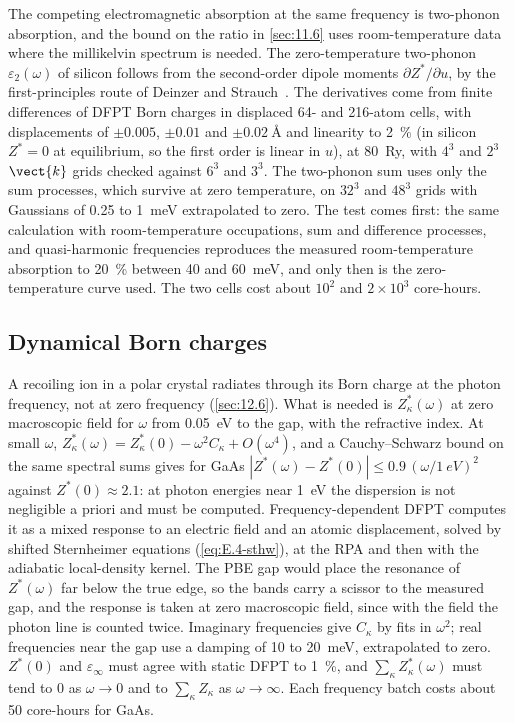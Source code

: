 The competing electromagnetic absorption at the same frequency is two-phonon absorption, and the bound on the ratio in \cref{sec:11.6} uses room-temperature data where the millikelvin spectrum is needed. The zero-temperature two-phonon $\varepsilon_2(\omega)$ of silicon follows from the second-order dipole moments $\partial Z^*/\partial u$, by the first-principles route of Deinzer and Strauch~\cite{deinzer2004two}. The derivatives come from finite differences of DFPT Born charges in displaced 64- and 216-atom cells, with displacements of $\pm0.005$, $\pm0.01$ and $\pm\SI{0.02}{\angstrom}$ and linearity to \SI{2}{\percent} (in silicon $Z^* = 0$ at equilibrium, so the first order is linear in $u$), at \SI{80}{Ry}, with $4^3$ and $2^3$ $\vect{k}$ grids checked against $6^3$ and $3^3$. The two-phonon sum uses only the sum processes, which survive at zero temperature, on $32^3$ and $48^3$ grids with Gaussians of 0.25 to \SI{1}{meV} extrapolated to zero. The test comes first: the same calculation with room-temperature occupations, sum and difference processes, and quasi-harmonic frequencies reproduces the measured room-temperature absorption to \SI{20}{\percent} between 40 and \SI{60}{meV}, and only then is the zero-temperature curve used. The two cells cost about $10^2$ and $2\times10^3$ core-hours.

\subsection{Dynamical Born charges}

A recoiling ion in a polar crystal radiates through its Born charge at the photon frequency, not at zero frequency (\cref{sec:12.6}). What is needed is $Z^*_\kappa(\omega)$ at zero macroscopic field for $\omega$ from \SI{0.05}{eV} to the gap, with the refractive index. At small $\omega$, $Z^*_\kappa(\omega) = Z^*_\kappa(0) - \omega^2C_\kappa + O(\omega^4)$, and a Cauchy--Schwarz bound on the same spectral sums gives for GaAs $|Z^*(\omega) - Z^*(0)| \le 0.9\,(\omega/\SI{1}{eV})^2$ against $Z^*(0) \approx 2.1$: at photon energies near \SI{1}{eV} the dispersion is not negligible a priori and must be computed. Frequency-dependent DFPT computes it as a mixed response to an electric field and an atomic displacement, solved by shifted Sternheimer equations (\cref{eq:E.4-sthw}), at the RPA and then with the adiabatic local-density kernel. The PBE gap would place the resonance of $Z^*(\omega)$ far below the true edge, so the bands carry a scissor to the measured gap, and the response is taken at zero macroscopic field, since with the field the photon line is counted twice. Imaginary frequencies give $C_\kappa$ by fits in $\omega^2$; real frequencies near the gap use a damping of 10 to \SI{20}{meV}, extrapolated to zero. $Z^*(0)$ and $\varepsilon_\infty$ must agree with static DFPT to \SI{1}{\percent}, and $\sum_\kappa Z^*_\kappa(\omega)$ must tend to 0 as $\omega\to0$ and to $\sum_\kappa Z_\kappa$ as $\omega\to\infty$. Each frequency batch costs about 50 core-hours for GaAs.

